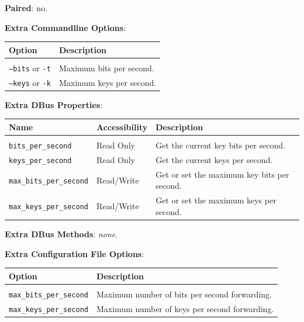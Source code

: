 \bigskip

\noindent \textbf{Paired}: no.

\bigskip

\noindent \textbf{Extra Commandline Options}: 

\medskip

\begin{tabular}{lp{10cm}}

Option                              & Description \\
\hline
\\
\texttt{--bits} or \texttt{-t}      & Maximum bits per second. \\ [0.5em]
\texttt{--keys} or \texttt{-k}      & Maximum keys per second. \\ [0.5em]

\end{tabular}

\bigskip

\noindent \textbf{Extra DBus Properties}:

\medskip

\begin{tabular}{llp{7cm}}

Name                                & Accessibility &   Description \\
\hline
\\
\texttt{bits\_per\_second}          & Read Only     &   Get the current key bits per second. \\ [0.5em]
\texttt{keys\_per\_second}          & Read Only     &   Get the current keys per second. \\ [0.5em]
\texttt{max\_bits\_per\_second}     & Read/Write    &   Get or set the maximum key bits per second. \\ [0.5em]
\texttt{max\_keys\_per\_second}     & Read/Write    &   Get or set the maximum keys per second. \\ [0.5em]

\end{tabular}

\bigskip

\noindent \textbf{Extra DBus Methods}: \emph{none}.

\bigskip

\noindent \textbf{Extra Configuration File Options}:

\medskip

\begin{tabular}{lp{9cm}}

Option                              & Description \\
\hline
\\
\texttt{max\_bits\_per\_second}     & Maximum number of bits per second forwarding. \\ [0.5em]
\texttt{max\_keys\_per\_second}     & Maximum number of keys per second forwarding. \\ [0.5em]

\end{tabular}

